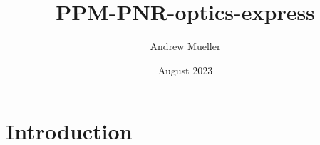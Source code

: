 \documentclass{article}
\title{PPM-PNR-optics-express}
\author{Andrew Mueller}
\date{August 2023}
\begin{document}
\maketitle

\section{Introduction}
\end{document}
